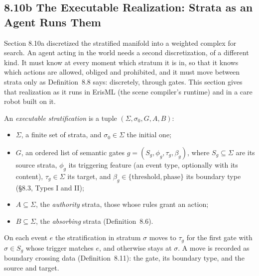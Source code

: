 
\subsection{8.10b The Executable Realization: Strata as an Agent Runs Them}\label{sec:executable-strata}

Section 8.10a discretized the stratified manifold into a weighted complex for search. An agent
acting in the world needs a second discretization, of a different kind. It must know at every
moment which stratum it is in, so that it knows which actions are allowed, obliged and prohibited,
and it must move between strata only as Definition~8.8 says: discretely, through gates. This
section gives that realization as it runs in ErisML (the scene compiler's runtime) and in a care
robot built on it.

\begin{definition}\label{GE-DEF-8-14}
An \emph{executable stratification} is a tuple $(\Sigma, \sigma_0, G, A, B)$:
\begin{itemize}
  \item $\Sigma$, a finite set of strata, and $\sigma_0 \in \Sigma$ the initial one;
  \item $G$, an ordered list of semantic gates $g = (S_g, \phi_g, \tau_g, \beta_g)$, where
        $S_g \subseteq \Sigma$ are its source strata, $\phi_g$ its triggering feature (an event type,
        optionally with its content), $\tau_g \in \Sigma$ its target, and
        $\beta_g \in \{\text{threshold}, \text{phase}\}$ its boundary type (\S8.3, Types I and II);
  \item $A \subseteq \Sigma$, the \emph{authority} strata, those whose rules grant an action;
  \item $B \subseteq \Sigma$, the \emph{absorbing} strata (Definition~8.6).
\end{itemize}
On each event $e$ the stratification in stratum $\sigma$ moves to $\tau_g$ for the first gate with
$\sigma \in S_g$ whose trigger matches $e$, and otherwise stays at $\sigma$. A move is recorded as
boundary crossing data (Definition~8.11): the gate, its boundary type, and the source and target.
\end{definition}

